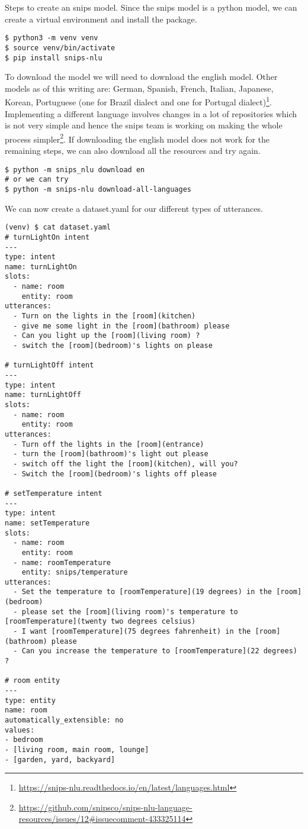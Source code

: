 \documentclass{book}
\begin{document}
Steps to create an snips model. Since the snips model is a python model, we can create a virtual environment and install the package.

\begin{lstlisting}[caption={}, basicstyle=\small]
$ python3 -m venv venv
$ source venv/bin/activate
$ pip install snips-nlu
\end{lstlisting}

To download the model we will need to download the english model. Other models as of this writing are: German, Spanish, French, Italian, Japanese, Korean, Portuguese (one for Brazil dialect and one for Portugal dialect)\footnote{\href{}{https://snips-nlu.readthedocs.io/en/latest/languages.html}}. Implementing a different language involves changes in a lot of repositories which is not very simple and hence the snips team is working on making the whole process simpler\footnote{\href{}{https://github.com/snipsco/snips-nlu-language-resources/issues/12\#issuecomment-433325114}}. If downloading the english model does not work for the remaining steps, we can also download all the resources and try again.

\begin{lstlisting}[caption={}, basicstyle=\small]
$ python -m snips_nlu download en
# or we can try
$ python -m snips-nlu download-all-languages
\end{lstlisting}

We can now create a dataset.yaml for our different types of utterances.

\begin{lstlisting}[caption={}, basicstyle=\tiny]
(venv) $ cat dataset.yaml
# turnLightOn intent
---
type: intent
name: turnLightOn
slots:
  - name: room
    entity: room
utterances:
  - Turn on the lights in the [room](kitchen)
  - give me some light in the [room](bathroom) please
  - Can you light up the [room](living room) ?
  - switch the [room](bedroom)'s lights on please

# turnLightOff intent
---
type: intent
name: turnLightOff
slots:
  - name: room
    entity: room
utterances:
  - Turn off the lights in the [room](entrance)
  - turn the [room](bathroom)'s light out please
  - switch off the light the [room](kitchen), will you?
  - Switch the [room](bedroom)'s lights off please

# setTemperature intent
---
type: intent
name: setTemperature
slots:
  - name: room
    entity: room
  - name: roomTemperature
    entity: snips/temperature
utterances:
  - Set the temperature to [roomTemperature](19 degrees) in the [room](bedroom)
  - please set the [room](living room)'s temperature to [roomTemperature](twenty two degrees celsius)
  - I want [roomTemperature](75 degrees fahrenheit) in the [room](bathroom) please
  - Can you increase the temperature to [roomTemperature](22 degrees) ?

# room entity
---
type: entity
name: room
automatically_extensible: no
values:
- bedroom
- [living room, main room, lounge]
- [garden, yard, backyard]
\end{lstlisting}
\end{document}
